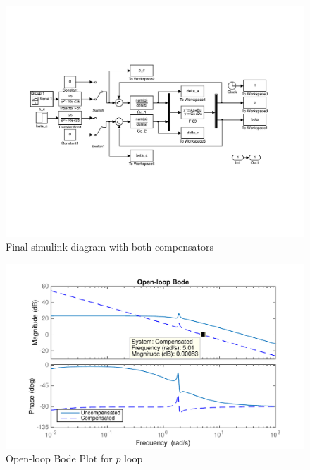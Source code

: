 \documentclass[11pt]{article}
\begin{document}
\begin{figure}[b!]
\begin{center}
\includegraphics[width=1\textwidth]{figures/simulink}
\caption{Final simulink diagram with both compensators}
\end{center}
\end{figure}

\clearpage
\begin{figure}[h!]
\begin{center}
\includegraphics[height=.4\textheight]{figures/openloop_p}
\caption{Open-loop Bode Plot for $p$ loop}
\end{center}
\end{figure}
\end{document}
